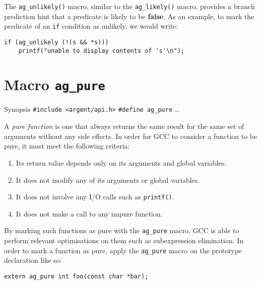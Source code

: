 The \verb|ag_unlikely()| macro, similar to the \verb|ag_likely()| macro,
provides a branch prediction hint that a predicate is likely to be 
\textbf{false}. As an example, to mark the predicate of an \verb|if| condition 
as unlikely, we would write:

\begin{lstlisting}[linewidth=1.0\linewidth]
if (ag_unlikely (!(s && *s))) 
    printf("unable to display contents of 's'\n");
\end{lstlisting}


\section{Macro \texttt{ag\_pure}}

\begin{bclogo}[logo=\bccrayon, noborder=true, barre=snake, couleurBarre=gray]
    {Synopsis}
  \verb|#include <argent/api.h>|
  \verb|#define ag_pure| \ldots
\end{bclogo}

A \emph{pure function} is one that always returns the same result for the same
set of arguments without any side effects. In order for GCC to consider a
function to be pure, it must meet the following criteria:
\begin{enumerate}
  \item Its return value depends only on its arguments and global variables.
  \item It does not modify any of its arguments or global variables.
  \item It does not involve any I/O calls such as \texttt{printf()}.
  \item It does not make a call to any impure function.
\end{enumerate}

By marking such functions as pure with the \texttt{ag\_pure} macro, GCC is able
to perform relevant optimisations on them such as subexpression elimination. In
order to mark a function as pure, apply the \texttt{ag\_pure} macro on the
prototype declaration like so:

\begin{lstlisting}[linewidth=1.0\linewidth]
extern ag_pure int foo(const char *bar);
\end{lstlisting}

